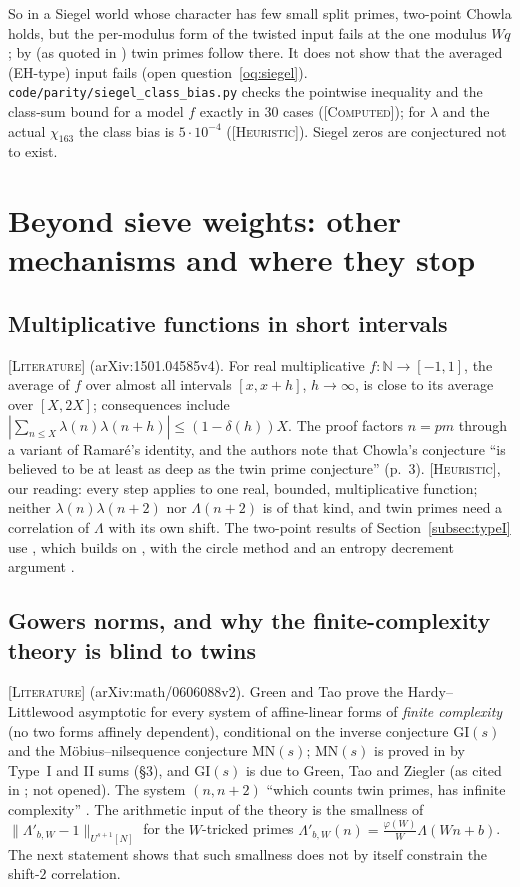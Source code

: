 \documentclass[11pt]{amsart}
\theoremstyle{definition}
\theoremstyle{remark}
\newcommand{\lbl}[1]{\textup{\textsc{[#1]}}}
\begin{document}
So in a Siegel world whose character has few small split primes, two-point
Chowla holds, but the per-modulus form of the twisted input fails at the one
modulus $Wq$; by \cite{HB83} (as quoted in \cite{TT22}) twin primes follow there. It does not
show that the averaged (EH-type) input fails (open question~\ref{oq:siegel}).
\texttt{code/}\allowbreak\texttt{parity/}\allowbreak\texttt{siegel\_class\_bias.py} checks the
pointwise inequality and the class-sum bound for a model $f$ exactly in $30$
cases (\lbl{Computed}); for $\lambda$ and the actual $\chi_{163}$ the class bias
is $5\cdot10^{-4}$ (\lbl{Heuristic}). Siegel zeros are conjectured not to exist.

\section{Beyond sieve weights: other mechanisms and where they stop}\label{sec:other}

\subsection{Multiplicative functions in short intervals}\label{subsec:mr16}
\lbl{Literature} \cite[Theorem~1, Corollaries~2, 4, 5]{MR16}
(arXiv:1501.04585v4). For real multiplicative $f:\mathbb N\to[-1,1]$, the average
of $f$ over almost all intervals $[x,x+h]$, $h\to\infty$, is close to its
average over $[X,2X]$; consequences include
$|\sum_{n\le X}\lambda(n)\lambda(n+h)|\le(1-\delta(h))X$. The proof factors
$n=pm$ through a variant of Ramar\'e's identity, and the authors note that
Chowla's conjecture ``is believed to be at least as deep as the twin prime
conjecture'' (p.~3). \lbl{Heuristic}, our reading: every step applies to one
real, bounded, multiplicative function; neither $\lambda(n)\lambda(n+2)$ nor
$\Lambda(n+2)$ is of that kind, and twin primes need a correlation of
$\Lambda$ with its own shift. The two-point results of
Section~\ref{subsec:typeI} use \cite{MRT15}, which builds on \cite{MR16}, with
the circle method and an entropy decrement argument \cite[p.~4]{Tao16}.

\subsection{Gowers norms, and why the finite-complexity theory is blind to twins}\label{subsec:gowers}
\lbl{Literature} \cite[pp.~7--9, 26--27]{GT10} (arXiv:math/0606088v2). Green and
Tao prove the Hardy--Littlewood asymptotic for every system of affine-linear
forms of \emph{finite complexity} (no two forms affinely dependent),
conditional on the inverse conjecture GI$(s)$ and the M\"obius--nilsequence
conjecture MN$(s)$; MN$(s)$ is proved in \cite{GT12} by Type~I and II sums
(\S3), and GI$(s)$ is due to Green, Tao and Ziegler (as cited in
\cite[p.~4, ref.~32]{Tao16b}; not opened). The system $(n,n+2)$ ``which counts
twin primes, has infinite complexity'' \cite[p.~7]{GT10}. The arithmetic input
of the theory is the smallness of $\|\Lambda'_{b,W}-1\|_{U^{s+1}[N]}$ for the
$W$-tricked primes $\Lambda'_{b,W}(n)=\frac{\varphi(W)}W\Lambda(Wn+b)$. The next statement shows that such smallness does not by
itself constrain the shift-$2$ correlation.
\end{document}

